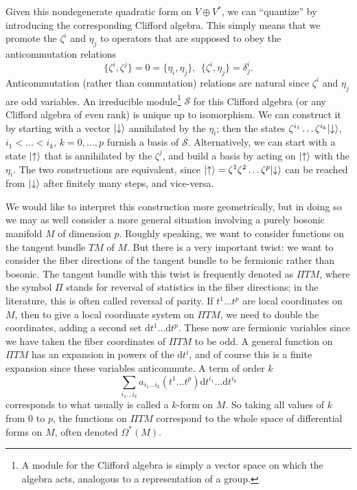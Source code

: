 \documentclass[11pt,a4paper]{article}
\def\S{{\mathcal S}}
\def\d{{\mathrm d}}
\def\neg{\negthickspace}
\def\Pi{\varPi}
\begin{document}
Given this nondegenerate quadratic form on $V\oplus V^*$, we can ``quantize'' by introducing the corresponding Clifford algebra.  This simply means that we promote
the $\zeta^i$ and $\eta_j$ to operators that are supposed to obey the anticommutation relations
\begin{equation}\label{orzok} \{\zeta^i,\zeta^j\}=0=\{\eta_i,\eta_j\},~~\{\zeta^i,\eta_j\}=\delta^i_j.\end{equation}
Anticommutation (rather than commutation) relations are natural since  $\zeta^i$ and $\eta_j$ are odd variables. 
An irreducible module\footnote{A module for the Clifford algebra is simply a vector space on
which the algebra acts, analogous to  a representation of a group.}
 $\S$ for this Clifford algebra (or any Clifford algebra of even rank) is unique up to isomorphism.  We can construct
it by starting with a vector $|\neg\downarrow\rangle$ annihilated by the $\eta_i$; then the states $\zeta^{i_1}\dots \zeta^{i_k}|\neg\downarrow\rangle$, $i_1<\dots<i_k,
\,k=0,\dots,p$ furnish a basis of $\S$.  Alternatively, we can start with a state $|\neg\uparrow\rangle$ that is annihilated by the $\zeta^j$, and build
a basis by acting on $|\neg\uparrow\rangle$ with the $\eta_i$.   The two constructions are equivalent, since $|\neg\uparrow\rangle= \zeta^1\zeta^2\dots \zeta^p|\neg\downarrow\rangle$
can be reached from $|\neg\downarrow\rangle$ after finitely many steps, and vice-versa.

We would like to interpret this construction more geometrically, but in doing so we may as well consider a more general situation involving a purely bosonic manifold 
 $M$  of dimension $p$.  Roughly speaking, we want to consider functions on the tangent bundle $TM$ of $M$.  But there is a very important
twist: we want to consider the fiber directions of the tangent bundle to be fermionic rather than bosonic.    The tangent bundle with this twist is frequently denoted as ${\Pi} TM$,
where the symbol ${\Pi}$ stands for reversal of statistics in the fiber directions; in the literature, this is often called reversal of parity.  If $t^1\dots t^p$ are local coordinates on $M$,
then to give a local coordinate system on ${\Pi} TM$, we need to double the coordinates, adding a second set $\d t^1\dots\d t^p$.  These now are fermionic variables since we 
have taken the fiber coordinates of ${\Pi} TM$ to be odd.  A general function on ${\Pi} TM$ has an expansion in powers of the $\d t^i$, and of course this is a finite expansion
since these variables anticommute.  A term of order $k$
\begin{equation}\label{ohomo} \sum_{i_1\dots i_k}a_{i_1\dots i_k}(t^1\dots t^p)\d t^{i_1}\dots\d t^{i_k} \end{equation}
corresponds to what usually is called a $k$-form on $M$.  So taking all values of $k$ from 0 to $p$, the functions on ${\Pi} TM$ correspond to the whole space of differential
forms on $M$, often denoted $\Omega^*(M)$.
\end{document}
